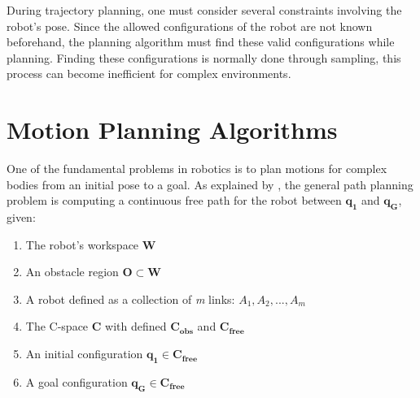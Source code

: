 During trajectory planning, one must consider several constraints involving the robot's pose. Since the allowed configurations of the robot are not known beforehand, the planning algorithm must find these valid configurations while planning. Finding these configurations is normally done through sampling, this process can become inefficient for complex environments.

%

\section{Motion Planning Algorithms}

One of the fundamental problems in robotics is to plan motions for complex bodies from an initial pose to a goal. As explained by \citet{Handbook}, the general path planning problem is computing a continuous free path for the robot between $\bm{q_{1}}$ and $\bm{q_{G}}$, given:
\begin{enumerate}
	\vspace{-5pt}
	\item The robot's workspace $\bm{W}$
	\vspace{-5pt}
	\item An obstacle region $\bm{O} \subset \bm{W}$
	\vspace{-5pt}
	\item A robot defined as a collection of \textit{m} links: $A_{1}, A_{2}, ... , A_{m}$
	\vspace{-5pt}
	\item The C-space $\bm{C}$ with defined $\bm{C_{obs}}$ and $\bm{C_{free}}$
	\vspace{-5pt} 
	\item An initial configuration $\bm{q_{1}} \in  \bm{C_{free}}$
	\vspace{-5pt} 
	\item A goal configuration $\bm{q_{G}} \in  \bm{C_{free}}$
\end{enumerate}

